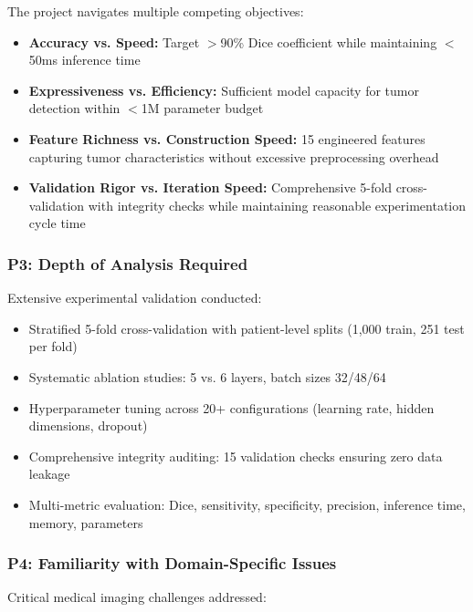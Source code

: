 The project navigates multiple competing objectives:

\begin{itemize}
    \item \textbf{Accuracy vs. Speed:} Target $>$90\% Dice coefficient while maintaining $<$50ms inference time
    \item \textbf{Expressiveness vs. Efficiency:} Sufficient model capacity for tumor detection within $<$1M parameter budget
    \item \textbf{Feature Richness vs. Construction Speed:} 15 engineered features capturing tumor characteristics without excessive preprocessing overhead
    \item \textbf{Validation Rigor vs. Iteration Speed:} Comprehensive 5-fold cross-validation with integrity checks while maintaining reasonable experimentation cycle time
\end{itemize}

\subsubsection*{P3: Depth of Analysis Required}

Extensive experimental validation conducted:

\begin{itemize}
    \item Stratified 5-fold cross-validation with patient-level splits (1,000 train, 251 test per fold)
    \item Systematic ablation studies: 5 vs. 6 layers, batch sizes 32/48/64
    \item Hyperparameter tuning across 20+ configurations (learning rate, hidden dimensions, dropout)
    \item Comprehensive integrity auditing: 15 validation checks ensuring zero data leakage
    \item Multi-metric evaluation: Dice, sensitivity, specificity, precision, inference time, memory, parameters
\end{itemize}

\subsubsection*{P4: Familiarity with Domain-Specific Issues}

Critical medical imaging challenges addressed:

